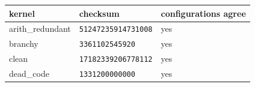 \begin{tabular}{lll}
\toprule
kernel & checksum & configurations agree \\
\midrule
arith\_redundant & \texttt{51247235914731008} & yes \\
branchy & \texttt{3361102545920} & yes \\
clean & \texttt{17182339206778112} & yes \\
dead\_code & \texttt{1331200000000} & yes \\
\bottomrule
\end{tabular}
